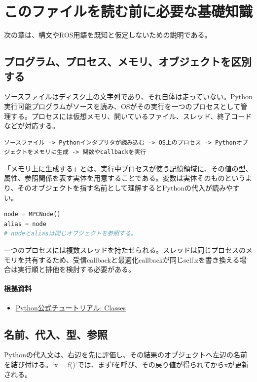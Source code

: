 \documentclass[a4paper,11pt]{article}
\begin{document}
        \section{このファイルを読む前に必要な基礎知識}
        次の章は、構文やROS用語を既知と仮定しないための説明である。

        \subsection{プログラム、プロセス、メモリ、オブジェクトを区別する}
ソースファイルはディスク上の文字列であり、それ自体は走っていない。Python実行可能プログラムがソースを読み、OSがその実行を一つのプロセスとして管理する。プロセスには仮想メモリ、開いているファイル、スレッド、終了コードなどが対応する。


\begin{lstlisting}
ソースファイル -> Pythonインタプリタが読み込む -> OS上のプロセス -> Pythonオブジェクトをメモリに生成 -> 関数やcallbackを実行
\end{lstlisting}


「メモリ上に生成する」とは、実行中プロセスが使う記憶領域に、その値の型、属性、参照関係を表す実体を用意することである。変数は実体そのものというより、そのオブジェクトを指す名前として理解するとPythonの代入が読みやすい。


\begin{lstlisting}[language=python]
node = MPCNode()
alias = node
# nodeとaliasは同じオブジェクトを参照する。
\end{lstlisting}


一つのプロセスには複数スレッドを持たせられる。スレッドは同じプロセスのメモリを共有するため、受信callbackと最適化callbackが同じself.zを書き換える場合は実行順と排他を検討する必要がある。

\paragraph{根拠資料}
\begin{itemize}[leftmargin=1.6em]
\item \href{https://docs.python.org/3/tutorial/classes.html}{Python公式チュートリアル: Classes}
\end{itemize}

\subsection{名前、代入、型、参照}
Pythonの代入文は、右辺を先に評価し、その結果のオブジェクトへ左辺の名前を結び付ける。`x = f()`では、まずfを呼び、その戻り値が得られてからxが更新される。
\end{document}
